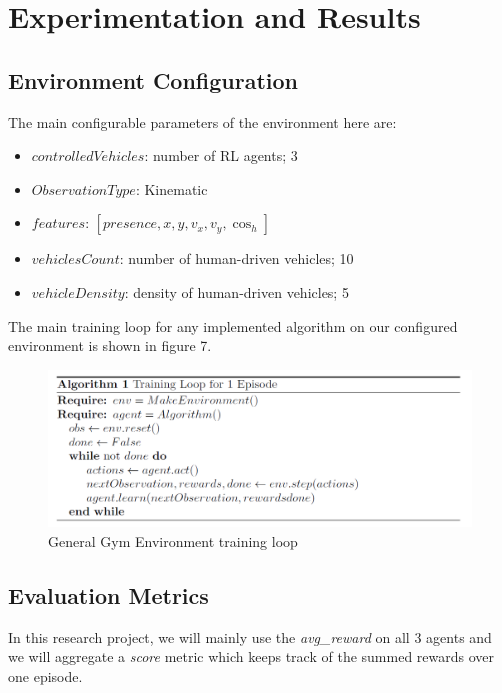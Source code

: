\documentclass[conference]{IEEEtran}
\begin{document}
\section{Experimentation and Results}

\subsection{Environment Configuration}
The main configurable parameters of the environment here are:
\begin{itemize}
    \item $controlledVehicles$: number of RL agents; 3
    \item $ObservationType$: Kinematic
    \item $features$: $[presence, x, y, v_x, v_y, \cos_h]$
    \item $vehiclesCount$: number of human-driven vehicles; 10
    \item $vehicleDensity$: density of human-driven vehicles; 5
\end{itemize}

The main training loop for any implemented algorithm on our configured environment is shown in figure 7.

\begin{figure}[hbt!]
\centerline{\includegraphics[width=1.0\linewidth]{images/gym_loop.png}}
\caption{General Gym Environment training loop}
\label{fig10}
\end{figure}

\subsection{Evaluation Metrics}
In this research project, we will mainly use the \textit{avg\_reward} on all 3 agents and we will aggregate a \textit{score} metric
which keeps track of the summed rewards over one episode. 
\end{document}
